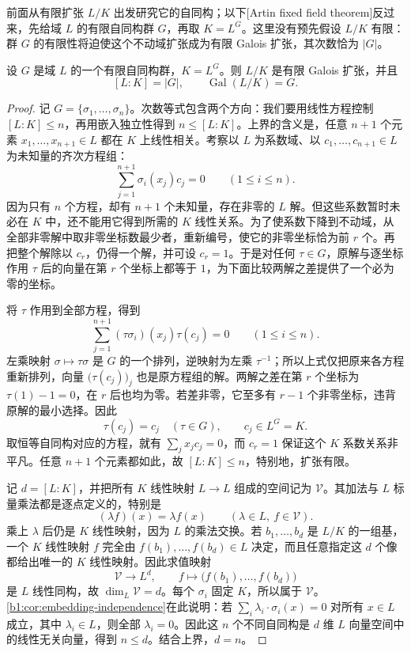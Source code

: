 前面从有限扩张 \(L/K\) 出发研究它的自同构；以下[Artin fixed field theorem]反过来，先给域 \(L\) 的有限自同构群 \(G\)，再取 \(K=L^G\)。这里没有预先假设 \(L/K\) 有限：群 \(G\) 的有限性将迫使这个不动域扩张成为有限 Galois 扩张，其次数恰为 \(|G|\)。
\begin{theorem}[Artin]\label{b1:thm:artin-fixed-field}
	设 \(G\) 是域 \(L\) 的一个有限自同构群，\(K=L^G\)。则 \(L/K\) 是有限 Galois 扩张，并且
	\[
		[L:K]=|G|,\qquad \operatorname{Gal}(L/K)=G.
	\]
\end{theorem}
\begin{proof}
	记 \(G=\{\sigma_1,\ldots,\sigma_n\}\)。次数等式包含两个方向：我们要用线性方程控制 \([L:K]\leq n\)，再用嵌入独立性得到 \(n\leq[L:K]\)。上界的含义是，任意 \(n+1\) 个元素 \(x_1,\ldots,x_{n+1}\in L\) 都在 \(K\) 上线性相关。考察以 \(L\) 为系数域、以 \(c_1,\ldots,c_{n+1}\in L\) 为未知量的齐次方程组：
	\[
		\sum_{j=1}^{n+1}\sigma_i(x_j)c_j=0\qquad(1\leq i\leq n).
	\]
	因为只有 \(n\) 个方程，却有 \(n+1\) 个未知量，存在非零的 \(L\) 解。但这些系数暂时未必在 \(K\) 中，还不能用它得到所需的 \(K\) 线性关系。为了使系数下降到不动域，从全部非零解中取非零坐标数最少者，重新编号，使它的非零坐标恰为前 \(r\) 个。再把整个解除以 \(c_r\)，仍得一个解，并可设 \(c_r=1\)。于是对任何 \(\tau\in G\)，原解与逐坐标作用 \(\tau\) 后的向量在第 \(r\) 个坐标上都等于 \(1\)，为下面比较两解之差提供了一个必为零的坐标。

	将 \(\tau\) 作用到全部方程，得到
	\[
		\sum_{j=1}^{n+1}(\tau\sigma_i)(x_j)\tau(c_j)=0 \qquad(1\leq i\leq n).
	\]
	左乘映射 \(\sigma\mapsto\tau\sigma\) 是 \(G\) 的一个排列，逆映射为左乘 \(\tau^{-1}\)；所以上式仅把原来各方程重新排列，向量 \(\bigl(\tau(c_j)\bigr)_j\) 也是原方程组的解。两解之差在第 \(r\) 个坐标为 \(\tau(1)-1=0\)，在 \(r\) 后也均为零。若差非零，它至多有 \(r-1\) 个非零坐标，违背原解的最小选择。因此
	\[
		\tau(c_j)=c_j\quad(\tau\in G),\qquad c_j\in L^G=K.
	\]
	取恒等自同构对应的方程，就有 \(\sum_j x_jc_j=0\)，而 \(c_r=1\) 保证这个 \(K\) 系数关系非平凡。任意 \(n+1\) 个元素都如此，故 \([L:K]\leq n\)，特别地，扩张有限。

	记 \(d=[L:K]\)，并把所有 \(K\) 线性映射 \(L\rightarrow L\) 组成的空间记为 \(\mathcal V\)。其加法与 \(L\) 标量乘法都是逐点定义的，特别是
	\[
		(\lambda f)(x)=\lambda f(x)\qquad(\lambda\in L,\ f\in\mathcal V).
	\]
	乘上 \(\lambda\) 后仍是 \(K\) 线性映射，因为 \(L\) 的乘法交换。若 \(b_1,\ldots,b_d\) 是 \(L/K\) 的一组基，一个 \(K\) 线性映射 \(f\) 完全由 \(f(b_1),\ldots,f(b_d)\in L\) 决定，而且任意指定这 \(d\) 个像都给出唯一的 \(K\) 线性映射。因此求值映射
	\[
		\mathcal V\longrightarrow L^d,\qquad f\longmapsto\bigl(f(b_1),\ldots,f(b_d)\bigr)
	\]
	是 \(L\) 线性同构，故 \(\dim_L\mathcal V=d\)。每个 \(\sigma_i\) 固定 \(K\)，所以属于 \(\mathcal V\)。\cref{b1:cor:embedding-independence}在此说明：若 \(\sum_i\lambda_i\cdot\sigma_i(x)=0\) 对所有 \(x\in L\) 成立，其中 \(\lambda_i\in L\)，则全部 \(\lambda_i=0\)。因此这 \(n\) 个不同自同构是 \(d\) 维 \(L\) 向量空间中的线性无关向量，得到 \(n\leq d\)。结合上界，\(d=n\)。


\end{proof}
